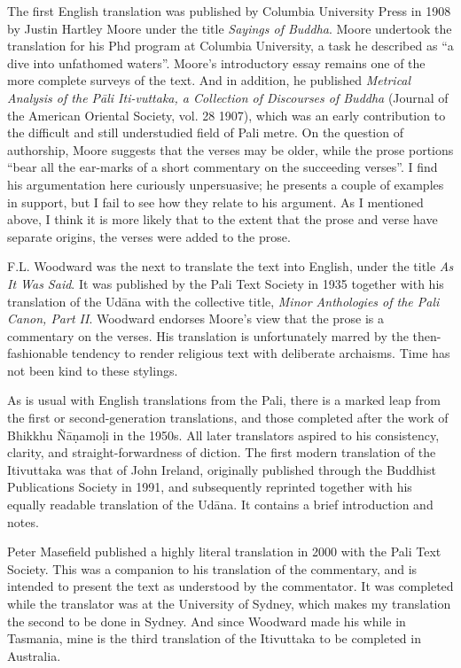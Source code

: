 \documentclass[12pt,openany]{book}%
\begin{document}
The first English translation was published by Columbia University Press in 1908 by Justin Hartley Moore under the title \textit{Sayings of Buddha}. Moore undertook the translation for his Phd program at Columbia University, a task he described as “a dive into unfathomed waters”. Moore’s introductory essay remains one of the more complete surveys of the text. And in addition, he published \textit{Metrical Analysis of the \textsanskrit{Pāli} Iti-vuttaka, a Collection of Discourses of Buddha} (Journal of the American Oriental Society, vol. 28 1907), which was an early contribution to the difficult and still understudied field of Pali metre.  On the question of authorship, Moore suggests that the verses may be older, while the prose portions “bear all the ear-marks of a short commentary on the succeeding verses”. I find his argumentation here curiously unpersuasive; he presents a couple of examples in support, but I fail to see how they relate to his argument. As I mentioned above, I think it is more likely that to the extent that the prose and verse have separate origins, the verses were added to the prose.

F.L. Woodward was the next to translate the text into English, under the title \textit{As It Was Said}. It was published by the Pali Text Society in 1935 together with his translation of the \textsanskrit{Udāna} with the collective title, \textit{Minor Anthologies of the Pali Canon, Part II}. Woodward endorses Moore’s view that the prose is a commentary on the verses. His translation is unfortunately marred by the then-fashionable tendency to render religious text with deliberate archaisms. Time has not been kind to these stylings.

As is usual with English translations from the Pali, there is a marked leap from the first or second-generation translations, and those completed after the work of Bhikkhu \textsanskrit{Ñāṇamoḷi} in the 1950s. All later translators aspired to his consistency, clarity, and straight-forwardness of diction. The first modern translation of the Itivuttaka was that of John Ireland, originally published through the Buddhist Publications Society in 1991, and subsequently reprinted together with his equally readable translation of the \textsanskrit{Udāna}. It contains a brief introduction and notes.

Peter Masefield published a highly literal translation in 2000 with the Pali Text Society. This was a companion to his translation of the commentary, and is intended to present the text as understood by the commentator. It was completed while the translator was at the University of Sydney, which makes my translation the second to be done in Sydney. And since Woodward made his while in Tasmania, mine is the third translation of the Itivuttaka to be completed in Australia.
\end{document}

